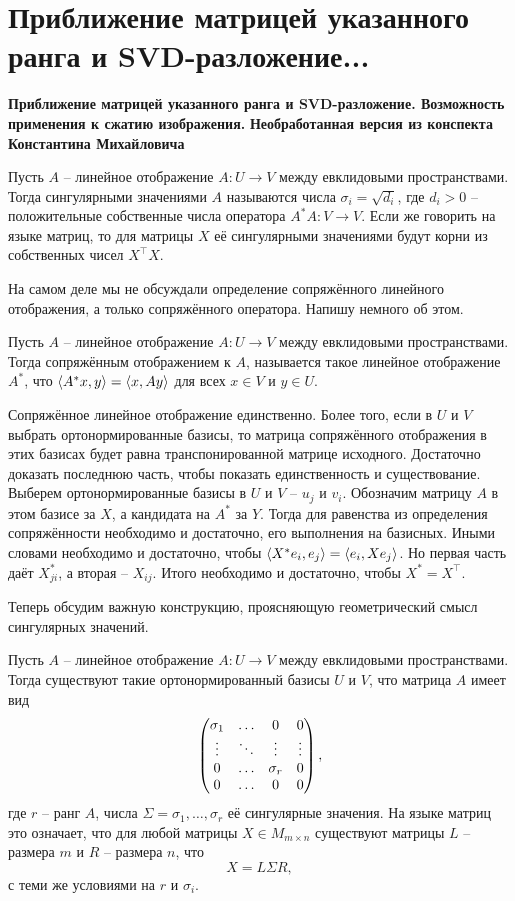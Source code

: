 \section{
 Приближение матрицей указанного ранга и SVD-разложение...
}
\textbf{Приближение матрицей указанного ранга и SVD-разложение. Возможность применения к сжатию изображения.}
\textbf{Необработанная версия из конспекта Константина Михайловича}

 Пусть $A$ -- линейное отображение $A\colon U \to V$ между евклидовыми пространствами. Тогда сингулярными значениями $A$ называются числа $\sigma_i=\sqrt{d_i}$, где $d_i>0$ -- положительные собственные числа оператора $A^*A \colon V \to V$. Если же говорить на языке матриц, то для матрицы $X$ её сингулярными значениями будут корни из собственных чисел $X^{\top}X$. 
\edfn

На самом деле мы не обсуждали определение сопряжённого линейного отображения, а только сопряжённого оператора. Напишу немного об этом.

\dfn Пусть $A$ -- линейное отображение $A\colon U \to V$ между евклидовыми пространствами. Тогда сопряжённым отображением к $A$, называется такое линейное отображение $A^{*}$, что $\left\langle A^*x,y\right\rangle = \left\langle x,Ay\right\rangle$ для всех $x\in V$ и $y \in U$.
\edfn

\thrm Сопряжённое линейное отображение единственно. Более того, если в $U$ и $V$ выбрать ортонормированные базисы, то матрица сопряжённого отображения в этих базисах будет равна транспонированной матрице исходного.
\proof Достаточно доказать последнюю часть, чтобы показать единственность и существование. Выберем ортонормированные базисы в $U$ и $V$ -- $u_j$ и $v_i$. Обозначим матрицу $A$ в этом базисе за $X$, а кандидата на $A^*$ за $Y$. Тогда для равенства из определения сопряжённости необходимо и достаточно, его выполнения на базисных. Иными словами необходимо и достаточно, чтобы $\left\langle X^{*}e_i,e_j\right\rangle=\left\langle e_i,Xe_j\right\rangle$. Но первая часть даёт $X^{*}_{ji}$, а вторая -- $X_{ij}$. Итого необходимо и достаточно, чтобы $X^{*}=X^{\top}$.   
\endproof
\ethrm

Теперь обсудим важную конструкцию, проясняющую геометрический смысл сингулярных значений.


 Пусть $A$ -- линейное отображение $A\colon U \to V$ между евклидовыми пространствами. Тогда существуют такие ортонормированный базисы $U$ и $V$, что матрица $A$ имеет вид 
$$\begin{pmatrix} \sigma_1 &\dots& 0 & 0\\
 \vdots & \ddots &\vdots & \vdots\\
 0 & \dots & \sigma_r & 0\\
 0 &  \dots & 0 & 0 \end{pmatrix},$$
 где $r$ -- ранг $A$, числа $\Sigma=\sigma_1, \dots, \sigma_r$ её сингулярные значения.
На языке матриц это означает, что для любой матрицы $X \in M_{m\times n}$ существуют матрицы $L$ -- размера $m$ и $R$ -- размера $n$,  что
$$X= L \Sigma R,$$
 с теми же условиями на $r$ и $\sigma_i$.
 
